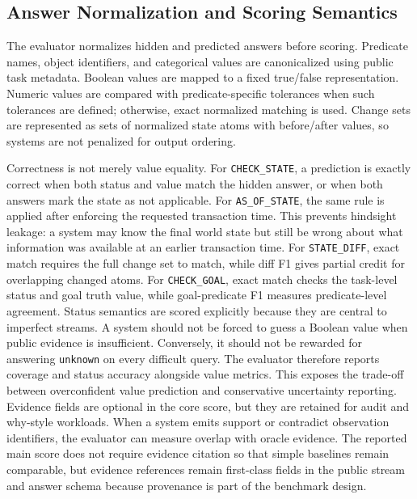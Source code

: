\subsection{Answer Normalization and Scoring Semantics}

The evaluator normalizes hidden and predicted answers before scoring. Predicate names, object identifiers, and categorical values are canonicalized using public task metadata. Boolean values are mapped to a fixed true/false representation. Numeric values are compared with predicate-specific tolerances when such tolerances are defined; otherwise, exact normalized matching is used. Change sets are represented as sets of normalized state atoms with before/after values, so systems are not penalized for output ordering.

Correctness is not merely value equality. For \texttt{CHECK\_STATE}, a prediction is exactly correct when both status and value match the hidden answer, or when both answers mark the state as not applicable. For \texttt{AS\_OF\_STATE}, the same rule is applied after enforcing the requested transaction time. This prevents hindsight leakage: a system may know the final world state but still be wrong about what information was available at an earlier transaction time. For \texttt{STATE\_DIFF}, exact match requires the full change set to match, while diff F1 gives partial credit for overlapping changed atoms. For \texttt{CHECK\_GOAL}, exact match checks the task-level status and goal truth value, while goal-predicate F1 measures predicate-level agreement.
Status semantics are scored explicitly because they are central to imperfect streams. A system should not be forced to guess a Boolean value when public evidence is insufficient. Conversely, it should not be rewarded for answering \texttt{unknown} on every difficult query. The evaluator therefore reports coverage and status accuracy alongside value metrics. This exposes the trade-off between overconfident value prediction and conservative uncertainty reporting.
Evidence fields are optional in the core score, but they are retained for audit and why-style workloads. When a system emits support or contradict observation identifiers, the evaluator can measure overlap with oracle evidence. The reported main score does not require evidence citation so that simple baselines remain comparable, but evidence references remain first-class fields in the public stream and answer schema because provenance is part of the benchmark design.

